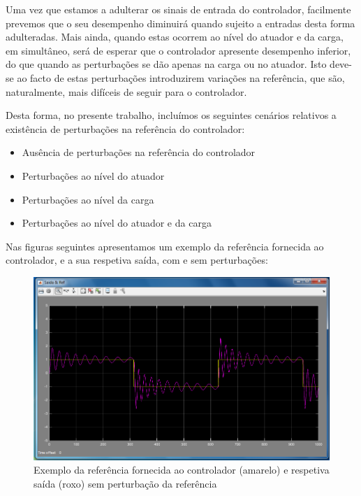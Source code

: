 \documentclass{article}
\begin{document}
Uma vez que estamos a adulterar os sinais de entrada do controlador, facilmente prevemos que o seu desempenho diminuirá quando sujeito a entradas desta forma adulteradas. Mais ainda, quando estas ocorrem ao nível do atuador e da carga, em simultâneo, será de esperar que o controlador apresente desempenho inferior, do que quando as perturbações se dão apenas na carga ou no atuador. Isto deve-se ao facto de estas perturbações introduzirem variações na referência, que são, naturalmente, mais difíceis de seguir para o controlador.

Desta forma, no presente trabalho, incluímos os seguintes cenários relativos a existência de perturbações na referência do controlador:

\begin{itemize}
\item Ausência de perturbações na referência do controlador
\item Perturbações ao nível do atuador
\item Perturbações ao nível da carga
\item Perturbações ao nível do atuador e da carga
\end{itemize}

Nas figuras seguintes apresentamos um exemplo da referência fornecida ao controlador, e a sua respetiva saída, com e sem perturbações:

\begin{figure}[H]
  \centering
      \includegraphics[scale=0.3]{Images/Mamdani_9_square.png}
  \caption{Exemplo da referência fornecida ao controlador (amarelo) e respetiva saída (roxo) sem perturbação da referência}
\end{figure}
\end{document}

